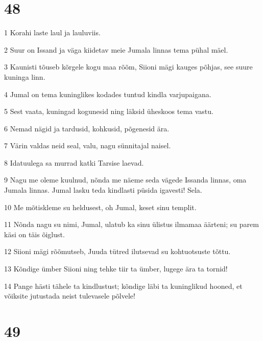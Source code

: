\chapter{48}

\par 1 Korahi laste laul ja lauluviis.
\par 2 Suur on Issand ja väga kiidetav meie Jumala linnas tema pühal mäel.
\par 3 Kaunisti tõuseb kõrgele kogu maa rõõm, Siioni mägi kauges põhjas, see suure kuninga linn.
\par 4 Jumal on tema kuninglikes kodades tuntud kindla varjupaigana.
\par 5 Sest vaata, kuningad kogunesid ning läksid üheskoos tema vastu.
\par 6 Nemad nägid ja tardusid, kohkusid, põgenesid ära.
\par 7 Värin valdas neid seal, valu, nagu sünnitajal naisel.
\par 8 Idatuulega sa murrad katki Tarsise laevad.
\par 9 Nagu me oleme kuulnud, nõnda me näeme seda vägede Issanda linnas, oma Jumala linnas. Jumal lasku teda kindlasti püsida igavesti! Sela.
\par 10 Me mõtiskleme su heldusest, oh Jumal, keset sinu templit.
\par 11 Nõnda nagu su nimi, Jumal, ulatub ka sinu ülistus ilmamaa äärteni; su parem käsi on täis õiglust.
\par 12 Siioni mägi rõõmutseb, Juuda tütred ilutsevad su kohtuotsuste tõttu.
\par 13 Kõndige ümber Siioni ning tehke tiir ta ümber, lugege ära ta tornid!
\par 14 Pange hästi tähele ta kindlustust; kõndige läbi ta kuninglikud hooned, et võiksite jutustada neist tulevasele põlvele!

\chapter{49}


